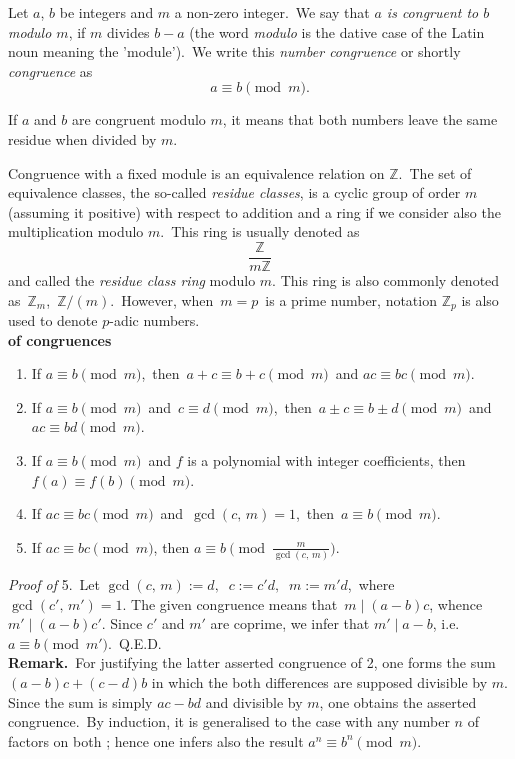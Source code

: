 \documentclass[12pt]{article}
\begin{document}
Let $a$, $b$ be integers and $m$ a non-zero integer.\, We say that \emph{$a$ is congruent to $b$ modulo $m$}, if $m$ divides $b-a$ (the word {\em modulo} is the dative case of the Latin noun  meaning the 'module').\, We write this {\em number congruence} or shortly {\em congruence} as
                         $$a\equiv b\pmod{m}.$$

If $a$ and $b$ are congruent modulo $m$, it means that both numbers leave the same residue when divided by $m$.

Congruence with a fixed module is an equivalence relation on $\mathbb{Z}$.\, The set of equivalence classes, the so-called {\em residue classes}, is a cyclic group of order $m$ (assuming it positive) with respect to addition and a ring if we consider also the multiplication modulo $m$.\, This ring is usually denoted as 
$$\frac{\mathbb{Z}}{m\mathbb{Z}}$$
and called the {\em residue class ring} modulo $m$.
This ring is also commonly denoted as\, $\mathbb{Z}_m$,\, $\mathbb{Z}/(m)$.\, However, when\, $m = p$\, is a prime number, notation $\mathbb{Z}_p$ is also used to denote $p$-adic numbers.\\

\textbf{ of congruences}
\begin{enumerate}
\item If\; $a\equiv b\pmod{m}$,\, then\, $a\!+\!c\equiv b\!+\!c\pmod{m}$\, and 
$ac\equiv bc\pmod{m}$.
\item If\; $a\equiv b\pmod{m}$\, and\, $c\equiv d\pmod{m}$,\, then\,
$a\!\pm\!c\equiv b\!\pm\!d\pmod{m}$\, and\, $ac\equiv bd\pmod{m}$.
\item If\; $a\equiv b\pmod{m}$\, and $f$ is a polynomial with integer coefficients, then\, $f(a)\equiv f(b)\pmod{m}$.
\item If\; $ac\equiv bc\pmod{m}$\, and\, $\gcd(c,\,m) = 1$,\, then\, 
$a\equiv b\pmod{m}$.
\item If\; $ac \equiv bc \pmod{m}$,\; then\; $a \equiv b \pmod{\frac{m}{\gcd(c,\,m)}}$.\\
\end{enumerate}


{\em Proof of} 5.\, Let\; $\gcd(c,\,m) := d,\;\; c := c'd,\;\; m := m'd$,\, where\; $\gcd(c',\,m') = 1$.\; The given congruence means that\, $m \mid (a\!-\!b)c$, whence\; $m' \mid (a\!-\!b)c'$.\; Since $c'$ and $m'$ are coprime, we infer that\; 
$m' \mid a\!-\!b$,\; i.e.\; $a \equiv b \pmod{m'}$.\, Q.E.D.\\

\textbf{Remark.}\, For justifying the latter asserted congruence of 2, one forms the sum $(a-b)c+(c-d)b$ in which the both differences are supposed divisible by $m$.\, Since the sum is simply $ac-bd$ and divisible by $m$, one obtains the asserted congruence.\, By induction, it is generalised to the case with any number $n$ of factors on both ; hence one infers also the result\; $a^n \equiv b^n \pmod{m}$.

\end{document}
